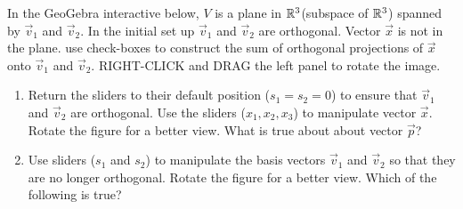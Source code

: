 \documentclass{ximera}
\begin{document}
\begin{exploration}\label{exp:orthProjSub}
In the GeoGebra interactive below, $V$ is a plane in $\mathbb{R}^3 $(subspace of $\mathbb{R}^3$) spanned by $\vec{v}_1$ and $\vec{v}_2$.  In the initial set up $\vec{v}_1$ and $\vec{v}_2$ are orthogonal.  Vector $\vec{x}$ is not in the plane.  use check-boxes to construct the sum of orthogonal projections of $\vec{x}$ onto $\vec{v}_1$ and $\vec{v}_2$.  RIGHT-CLICK and DRAG the left panel to rotate the image.
    \begin{center}
\end{center}
\begin{enumerate}
    \item Return the sliders to their default position ($s_1=s_2=0$) to ensure that $\vec{v}_1$ and $\vec{v}_2$ are orthogonal. Use the sliders ($x_1, x_2, x_3$) to manipulate vector $\vec{x}$.  Rotate the figure for a better view.  What is true about about vector $\vec{p}$?
    
    \begin{multipleChoice}
 \end{multipleChoice}

 \item 
 Use sliders ($s_1$ and $s_2$) to manipulate the basis vectors $\vec{v}_1$ and $\vec{v}_2$ so that they are no longer orthogonal.  Rotate the figure for a better view.  Which of the following is true?
 \begin{multipleChoice}
 \end{multipleChoice}
\end{enumerate}
\end{exploration}


\end{document}
